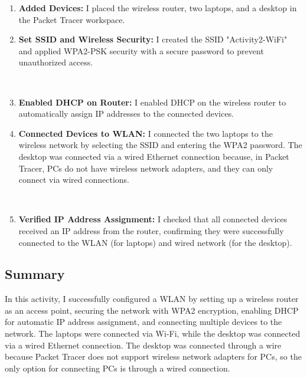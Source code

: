 \documentclass[11pt,a4paper]{article}
\let\oldincludegraphics\includegraphics
\renewcommand{\includegraphics}[2][]{%
  \begin{center}
    \oldincludegraphics[#1]{#2}
  \end{center}
}
\begin{document}
\begin{enumerate}
\item \textbf{Added Devices:} I placed the wireless router, two laptops, and a desktop in the Packet Tracer workspace.


\item \textbf{Set SSID and Wireless Security:} I created the SSID "Activity2-WiFi" and applied WPA2-PSK security with a secure password to prevent unauthorized access.

 \\[1em]

\item \textbf{Enabled DHCP on Router:} I enabled DHCP on the wireless router to automatically assign IP addresses to the connected devices.


\item \textbf{Connected Devices to WLAN:} I connected the two laptops to the wireless network by selecting the SSID and entering the WPA2 password. The desktop was connected via a wired Ethernet connection because, in Packet Tracer, PCs do not have wireless network adapters, and they can only connect via wired connections.

 \\[1em]

\item \textbf{Verified IP Address Assignment:} I checked that all connected devices received an IP address from the router, confirming they were successfully connected to the WLAN (for laptops) and wired network (for the desktop).

\end{enumerate}

\subsection{Summary}

In this activity, I successfully configured a WLAN by setting up a wireless router as an access point, securing the network with WPA2 encryption, enabling DHCP for automatic IP address assignment, and connecting multiple devices to the network. The laptops were connected via Wi-Fi, while the desktop was connected via a wired Ethernet connection. The desktop was connected through a wire because Packet Tracer does not support wireless network adapters for PCs, so the only option for connecting PCs is through a wired connection.
\end{document}
